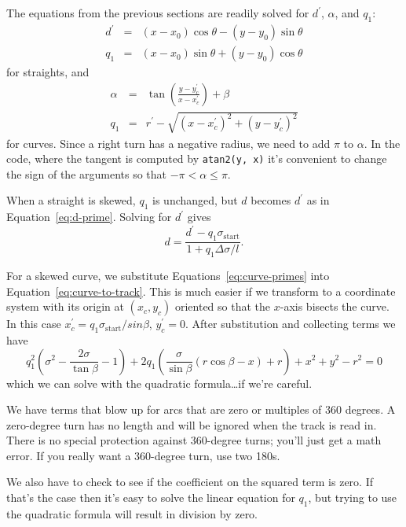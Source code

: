 \documentclass{article}
\newcommand{\skewstart}{%
  \ensuremath{\sigma_\mathrm{start}}}
\begin{document}
The equations from the previous sections are readily solved for
$d^\prime$, $\alpha$, and $q_1$:
\begin{eqnarray}
  d^\prime & = & (x - x_0)\cos\theta - (y - y_0)\sin\theta \\
  q_1 & = & (x - x_0)\sin\theta + (y - y_0)\cos\theta \nonumber
\end{eqnarray}
for straights, and
\begin{eqnarray}
  \label{eq:curve-to-track}
  \alpha & = & \tan\left(\frac{y - y_c^\prime}{x - x_c^\prime}\right) + \beta \\
  q_1 & = & r^\prime - \sqrt{(x - x_c^\prime)^2 + (y - y_c^\prime)^2} \nonumber
\end{eqnarray}
for curves.  Since a right turn has a negative radius, we need to add
$\pi$ to $\alpha$.  In the code, where the tangent is computed by
\verb/atan2(y, x)/ it's convenient to change the sign of the arguments
so that $-\pi < \alpha \leq \pi$.

When a straight is skewed, $q_1$ is unchanged, but $d$ becomes
$d^\prime$ as in Equation~\ref{eq:d-prime}.  Solving for $d^\prime$
gives
\begin{equation}
  d = \frac{d^\prime - q_1 \skewstart}{1 + q_1\Delta\sigma/l}.
\end{equation}

For a skewed curve, we substitute Equations~\ref{eq:curve-primes} into
Equation~\ref{eq:curve-to-track}.  This is much easier if we transform
to a coordinate system with its origin at $(x_c, y_c)$ oriented so
that the $x$-axis bisects the curve.  In this case $x_c^\prime = q_1
\skewstart / sin\beta$, $y_c^\prime = 0$.  After substitution and
collecting terms we have
\begin{equation}
  \label{eq:q1-solution}
  q_1^2\left(\sigma^2 - \frac{2\sigma}{\tan\beta} - 1\right) 
  + 2q_1\left(\frac{\sigma}{\sin\beta}(r\cos\beta - x) + r \right)
    + x^2 + y^2 - r^2 = 0
\end{equation}
which we can solve with the quadratic formula\ldots if we're careful.

We have terms that blow up for arcs that are zero or multiples of 360
degrees.  A zero-degree turn has no length and will be ignored when
the track is read in.  There is no special protection against
360-degree turns; you'll just get a math error.  If you really want a
360-degree turn, use two 180s. 

We also have to check to see if the coefficient on the squared term is
zero.  If that's the case then it's easy to solve the linear equation
for $q_1$, but trying to use the quadratic formula will result in
division by zero.
\end{document}

